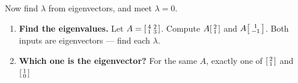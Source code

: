 \documentclass[10pt]{article}
\begin{document}
\begin{tcolorbox}[colback=white, colframe=black!40, title=\textbf{Tier A --- Approaching Proficiency},
    fonttitle=\bfseries, arc=1.5mm, left=3mm, right=3mm, top=2mm, bottom=2mm, breakable]
Now find $\lambda$ from eigenvectors, and meet $\lambda=0$.
\begin{enumerate}[leftmargin=1.7em, itemsep=9pt]
  \item \textbf{Find the eigenvalues.} Let $A=\begin{bsmallmatrix} 4 & 2\\ 1 & 3 \end{bsmallmatrix}$.
        Compute $A\begin{bsmallmatrix} 2\\ 1 \end{bsmallmatrix}$ and $A\begin{bsmallmatrix} 1\\ -1 \end{bsmallmatrix}$.
        Both inputs are eigenvectors --- find each $\lambda$.
  \item \textbf{Which one is the eigenvector?} For the same $A$, exactly one of
        $\begin{bsmallmatrix} 2\\ 1 \end{bsmallmatrix}$ and $\begin{bsmallmatrix} 1\\ 0 \end{bsmallmatrix}$

\end{enumerate}
\end{tcolorbox}
\end{document}
